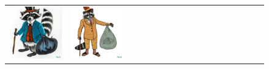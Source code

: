 \begin{figure}[ht!]
\begin{adjustwidth}{-0.8in}{-0.5in}
\begin{tabular}{cccccccccccccccccccc}
\multicolumn{2}{c}{\includegraphics[width=\threebythreecolwidth\textwidth]{figures/cherries/chinese.jpg}} &
\multicolumn{2}{c}{\includegraphics[width=\threebythreecolwidth\textwidth]{figures/cherries/madhubani.jpg}} &&

\end{tabular}
\end{adjustwidth}
\end{figure}
